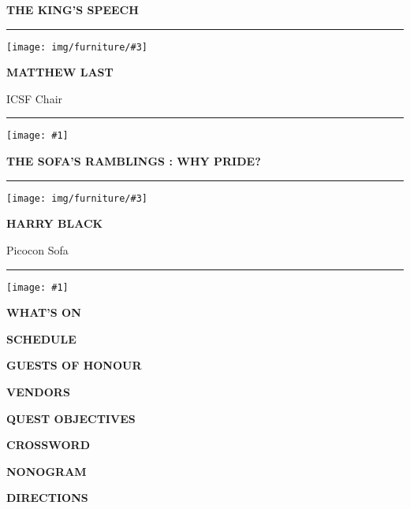 \documentclass[12pt]{article}
\newcommand{\tombstone}[1]{%
  \texttt{[image: \#1]}%
}
\newcommand{\altf}[1]{{\robotocondensed\textbf{\uppercase{#1}}}}
\newcommand{\decorated}[1]{\altf{\textbullet{} #1 \textbullet{}}}
\newcommand{\head}[1]{%
  \begin{center}
    {\Huge\decorated{#1}}
  \end{center}%
}
\newcommand{\article}[3]{%
  \vspace{2.5em}\hrule
  \begin{center}
    \centering
  \begin{minipage}{0.15\textwidth}
    \texttt{[image: img/furniture/\#3]}
  \end{minipage}\hspace{1em}
  \begin{minipage}{0.3\textwidth}
    {\Large \altf{#1}\par}\vspace{-0.7\baselineskip} #2
  \end{minipage}
  \end{center}
  \vspace{1em}\hrule\vspace{1.5em}
  \tombstone{img/tombstone/sci-fi}
  \par\hfill
}
\begin{document}
%

\clearpage
%
\head{The King's Speech}
\article{Matthew Last}{ICSF Chair}{chair}
\clearpage

\head{The Sofa's Ramblings : Why Pride?}
\article{Harry Black}{Picocon Sofa}{sofa}
\clearpage
%
\head{What's On}

\clearpage
%
\head{Schedule}

\clearpage
%
\head{Guests of Honour}

\clearpage
%
\head{Vendors}

\clearpage
%
\head{Quest Objectives}


\clearpage
%
\head{Crossword}


\clearpage
%
\head{Nonogram}

\vfill

\vfill
\clearpage
%
\head{Directions}

%
\end{document}
